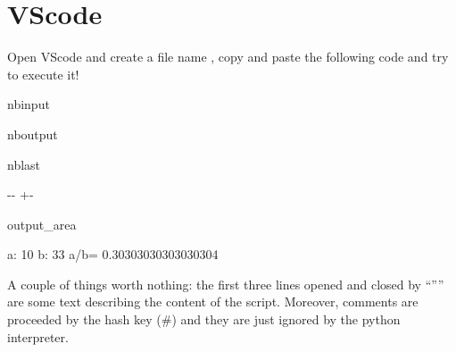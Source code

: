 \documentclass[letterpaper,10pt,english]{sphinxmanual}
\begin{document}
\section{VScode}
\label{\detokenize{M1_practical1:VScode}}
\sphinxAtStartPar
Open VScode and create a file name , copy and paste the following code and try to execute it!

\begin{sphinxuseclass}{nbinput}
{
\begin{sphinxVerbatim}[commandchars=\\\{\}]
\llap{\color{nbsphinxin}[2]:\,\hspace{\fboxrule}\hspace{\fboxsep}}
   
   
     

     
\end{sphinxVerbatim}
}

\end{sphinxuseclass}
\begin{sphinxuseclass}{nboutput}
\begin{sphinxuseclass}{nblast}
{

\kern-\sphinxverbatimsmallskipamount\kern-\baselineskip
\kern+\FrameHeightAdjust\kern-\fboxrule
\vspace{\nbsphinxcodecellspacing}

\begin{sphinxuseclass}{output_area}
\begin{sphinxuseclass}{}


\begin{sphinxVerbatim}[commandchars=\\\{\}]
a: 10  b: 33  a/b= 0.30303030303030304
\end{sphinxVerbatim}



\end{sphinxuseclass}
\end{sphinxuseclass}
}

\end{sphinxuseclass}
\end{sphinxuseclass}
\sphinxAtStartPar
A couple of things worth nothing: the first three lines opened and closed by “”” are some text describing the content of the script. Moreover, comments are proceeded by the hash key (\#) and they are just ignored by the python interpreter.
\end{document}
